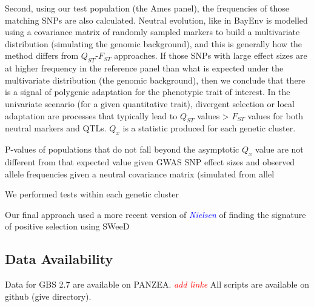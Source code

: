 \documentclass[9pt,twocolumn,twoside]{gsajnl}
\newcommand{\jri}[1]{\textcolor{red}{ \emph{ #1}} }
\newcommand{\kc}[1]{\textcolor{blue}{ \emph{ #1}} }
\begin{document}
Second, using our test population (the Ames panel), the frequencies of those matching SNPs are also calculated. 
Neutral evolution, like in BayEnv is modelled using a covariance matrix of randomly sampled markers to build a multivariate distribution (simulating the genomic background), and this is generally how the method differs from $Q_{ST}$-$F_{ST}$ approaches.
If those SNPs with large effect sizes are at higher frequency in the reference panel than what is expected under the multivariate distribution (the genomic background), then we conclude that there is a signal of polygenic adaptation for the phenotypic trait of interest.
In the univariate scenario (for a given quantitative trait), divergent selection or local adaptation are processes that typically lead to $Q_{ST}$ values > $F_{ST}$ values for both neutral markers and QTLs.
$Q_x$ is a statistic produced for each genetic cluster.

 
P-values of populations that do not fall beyond the asymptotic $Q_x$ value are not different from that expected value given GWAS SNP effect sizes and observed allele frequencies given a neutral covariance matrix (simulated from allel

We performed tests within each genetic cluster

Our final approach used a more recent version of \kc{Nielsen} of finding the signature of positive selection using SWeeD

\subsection*{Data Availability}

Data for GBS 2.7 are available on PANZEA.\jri{add linke} All scripts are available on github (give directory).


\end{document}
